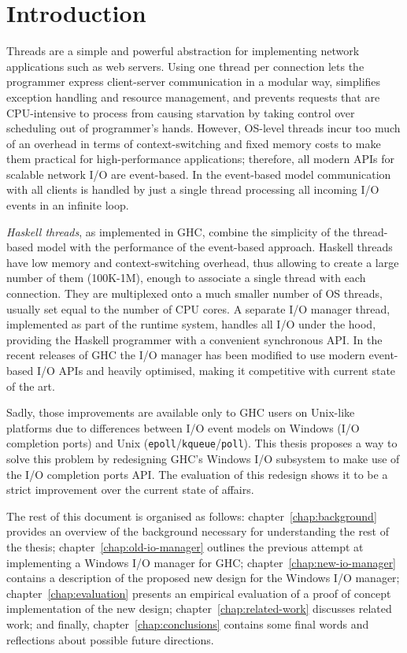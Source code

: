 \documentclass[a4paper,11pt,oneside]{report}
\begin{document}
\chapter{Introduction}

Threads are a simple and powerful abstraction for implementing network
applications such as web servers. Using one thread per connection lets the
programmer express client-server communication in a modular way, simplifies
exception handling and resource management, and prevents requests that are
CPU-intensive to process from causing starvation by taking control over
scheduling out of programmer's hands. However, OS-level threads incur too much
of an overhead in terms of context-switching and fixed memory costs to make them
practical for high-performance applications; therefore, all modern APIs for
scalable network I/O are event-based. In the event-based model communication
with all clients is handled by just a single thread processing all incoming I/O
events in an infinite loop.

\textit{Haskell threads}, as implemented in GHC, combine the simplicity of the
thread-based model with the performance of the event-based approach. Haskell
threads have low memory and context-switching overhead, thus allowing to create
a large number of them (100K-1M), enough to associate a single thread with each
connection. They are multiplexed onto a much smaller number of OS threads,
usually set equal to the number of CPU cores. A separate I/O manager thread,
implemented as part of the runtime system, handles all I/O under the hood,
providing the Haskell programmer with a convenient synchronous API. In the
recent releases of GHC the I/O manager has been modified to use modern
event-based I/O APIs and heavily optimised, making it competitive with current
state of the art.

Sadly, those improvements are available only to GHC users on Unix-like platforms
due to differences between I/O event models on Windows (I/O completion ports)
and Unix (\texttt{epoll}/\texttt{kqueue}/\texttt{poll}). This thesis proposes a
way to solve this problem by redesigning GHC's Windows I/O subsystem to make use
of the I/O completion ports API. The evaluation of this redesign shows it to be
a strict improvement over the current state of affairs.

The rest of this document is organised as follows: chapter~\ref{chap:background}
provides an overview of the background necessary for understanding the rest of
the thesis; chapter~\ref{chap:old-io-manager} outlines the previous attempt at
implementing a Windows I/O manager for GHC; chapter~\ref{chap:new-io-manager}
contains a description of the proposed new design for the Windows I/O manager;
chapter~\ref{chap:evaluation} presents an empirical evaluation of a proof of
concept implementation of the new design; chapter~\ref{chap:related-work}
discusses related work; and finally, chapter~\ref{chap:conclusions} contains
some final words and reflections about possible future directions.
\end{document}
